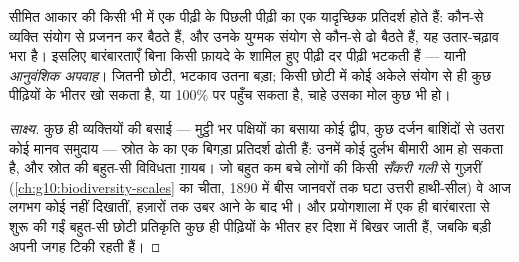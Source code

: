 \begin{proposition}[आनुवंशिक अपवाह]\label{prop:g12:selection-drift-speciation:drift}
सीमित आकार की किसी भी  में एक पीढ़ी के  पिछली पीढ़ी का एक
यादृच्छिक प्रतिदर्श होते हैं: कौन-से व्यक्ति संयोग से प्रजनन कर बैठते हैं,
और उनके युग्मक संयोग से कौन-से  ढो बैठते हैं, यह उतार-चढ़ाव
भरा है। इसलिए  बारंबारताएँ बिना किसी फ़ायदे के शामिल हुए पीढ़ी
दर पीढ़ी भटकती हैं --- यानी \emph{आनुवंशिक
अपवाह}।  जितनी छोटी, भटकाव उतना बड़ा; किसी छोटी
 में कोई  अकेले संयोग से ही कुछ पीढ़ियों के भीतर खो सकता
है, या 100\% पर पहुँच सकता है, चाहे उसका मोल कुछ भी हो।
\end{proposition}
\begin{proof}[साक्ष्य]
कुछ ही व्यक्तियों की बसाई  --- मुट्ठी भर पक्षियों का बसाया कोई
द्वीप, कुछ दर्जन बाशिंदों से उतरा कोई मानव समुदाय --- स्रोत  के
 का एक बिगड़ा प्रतिदर्श ढोती हैं: उनमें कोई दुर्लभ बीमारी
 आम हो सकता है, और स्रोत की बहुत-सी विविधता ग़ायब। जो 
बहुत कम बचे लोगों की किसी \emph{सँकरी गली} से गुज़रीं (\cref{ch:g10:biodiversity-scales}
का चीता, 1890 में बीस जानवरों तक घटा उत्तरी हाथी-सील) वे आज लगभग कोई
 नहीं दिखातीं, हज़ारों तक उबर आने के बाद भी। और प्रयोगशाला
में एक ही बारंबारता से शुरू की गईं बहुत-सी छोटी प्रतिकृति  कुछ ही
पीढ़ियों के भीतर हर दिशा में बिखर जाती हैं, जबकि बड़ी  अपनी जगह
टिकी रहती हैं।
\end{proof}

